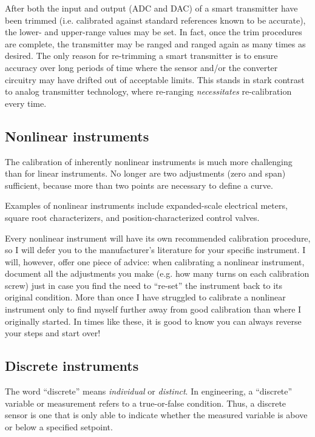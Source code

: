 \vskip 10pt

After both the input and output (ADC and DAC) of a smart transmitter have been trimmed (i.e. calibrated against standard references known to be accurate), the lower- and upper-range values may be set.  In fact, once the trim procedures are complete, the transmitter may be ranged and ranged again as many times as desired.  The only reason for re-trimming a smart transmitter is to ensure accuracy over long periods of time where the sensor and/or the converter circuitry may have drifted out of acceptable limits.  This stands in stark contrast to analog transmitter technology, where re-ranging \textit{necessitates} re-calibration every time.



\filbreak
\subsection{Nonlinear instruments}

The calibration of inherently nonlinear instruments is much more challenging than for linear instruments.  No longer are two adjustments (zero and span) sufficient, because more than two points are necessary to define a curve.

Examples of nonlinear instruments include expanded-scale electrical meters, square root characterizers, and position-characterized control valves.

Every nonlinear instrument will have its own recommended calibration procedure, so I will defer you to the manufacturer's literature for your specific instrument.  I will, however, offer one piece of advice: when calibrating a nonlinear instrument, document all the adjustments you make (e.g. how many turns on each calibration screw) just in case you find the need to ``re-set'' the instrument back to its original condition.  More than once I have struggled to calibrate a nonlinear instrument only to find myself further away from good calibration than where I originally started.  In times like these, it is good to know you can always reverse your steps and start over!





\filbreak
\subsection{Discrete instruments}

The word ``discrete'' means \textit{individual} or \textit{distinct}.  In engineering, a ``discrete'' variable or measurement refers to a true-or-false condition.  Thus, a discrete sensor is one that is only able to indicate whether the measured variable is above or below a specified setpoint. 

